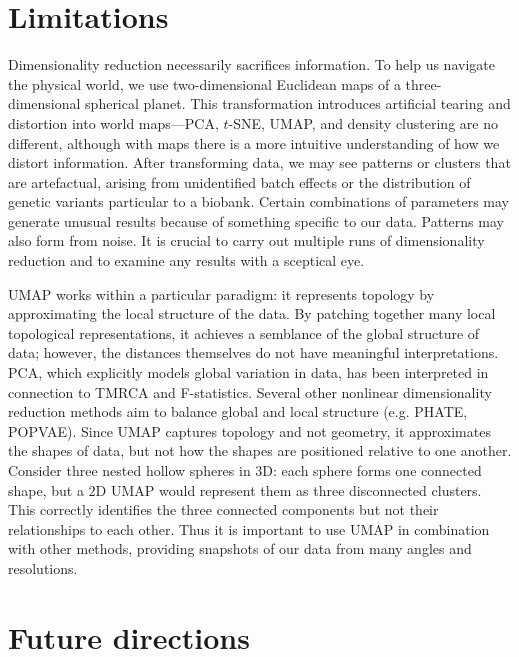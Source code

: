 \section{Limitations}

Dimensionality reduction necessarily sacrifices information. To help us navigate the physical world, we use two-dimensional Euclidean maps of a three-dimensional spherical planet. This transformation introduces artificial tearing and distortion into world maps---PCA, $t$-SNE, UMAP, and density clustering are no different, although with maps there is a more intuitive understanding of how we distort information. After transforming data, we may see patterns or clusters that are artefactual, arising from unidentified batch effects or the distribution of genetic variants particular to a biobank. Certain combinations of parameters may generate unusual results because of something specific to our data. Patterns may also form from noise. It is crucial to carry out multiple runs of dimensionality reduction and to examine any results with a sceptical eye.

UMAP works within a particular paradigm: it represents topology by approximating the local structure of the data. By patching together many local topological representations, it achieves a semblance of the global structure of data; however, the distances themselves do not have meaningful interpretations. PCA, which explicitly models global variation in data, has been interpreted in connection to TMRCA and F-statistics\citep{mcvean2009genealogical,peter_geometric_2022}. Several other nonlinear dimensionality reduction methods aim to balance global and local structure (e.g. PHATE\citep{moon2019visualizing}, POPVAE\citep{battey_visualizing_2021}). Since UMAP captures topology and not geometry, it approximates the shapes of data, but not how the shapes are positioned relative to one another. Consider three nested hollow spheres in $3$D: each sphere forms one connected shape, but a $2$D UMAP would represent them as three disconnected clusters\citep{herrmann_enhancing_2022}. This correctly identifies the three connected components but not their relationships to each other. Thus it is important to use UMAP in combination with other methods, providing snapshots of our data from many angles and resolutions.

\section{Future directions}

